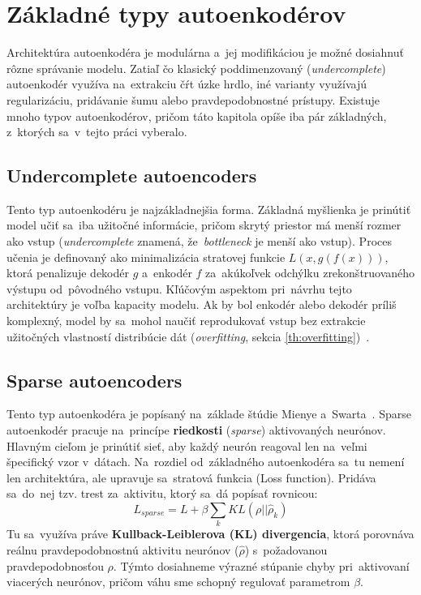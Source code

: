 \section{Základné typy autoenkodérov}\label{th:autoencoder_types}
Architektúra autoenkodéra je modulárna a~jej modifikáciou je možné dosiahnuť rôzne správanie modelu. Zatiaľ čo klasický poddimenzovaný (\textit{undercomplete}) autoenkodér využíva na~extrakciu čŕt úzke hrdlo, iné varianty využívajú regularizáciu, pridávanie šumu alebo pravdepodobnostné prístupy. Existuje mnoho typov autoenkodérov, pričom táto kapitola opíše iba pár základných, z~ktorých sa~v~tejto práci vyberalo.

\subsection{Undercomplete autoencoders}
Tento typ autoenkodéru je najzákladnejšia forma. Základná myšlienka je prinútiť model učiť sa~iba užitočné informácie, pričom skrytý priestor má menší rozmer ako vstup (\textit{undercomplete} znamená, že~\textit{bottleneck} je menší ako vstup). Proces učenia je definovaný ako minimalizácia stratovej funkcie $L(x,g(f(x)))$, ktorá penalizuje dekodér $g$ a~enkodér $f$ za~akúkoľvek odchýlku zrekonštruovaného výstupu od~pôvodného vstupu. Kľúčovým aspektom pri~návrhu tejto architektúry je voľba kapacity modelu. Ak by bol enkodér alebo dekodér príliš komplexný, model by sa~mohol naučiť reprodukovať vstup bez extrakcie užitočných vlastností distribúcie dát (\textit{overfitting}, sekcia \ref{th:overfitting})~\cite{Goodfellow-et-al-2016}.

\subsection{Sparse autoencoders}
Tento typ autoenkodéra je popísaný na~základe štúdie Mienye a~Swarta~\cite{mienye2025deep}. Sparse autoenkodér pracuje na~princípe \textbf{riedkosti} (\textit{sparse}) aktivovaných neurónov. Hlavným cieľom je prinútiť sieť, aby každý neurón reagoval len na~veľmi špecifický vzor v~dátach. Na~rozdiel od~základného autoenkodéra sa~tu nemení len architektúra, ale upravuje sa~stratová funkcia (Loss function). Pridáva sa~do~nej tzv. trest za~aktivitu, ktorý sa~dá popísať rovnicou:
\begin{equation}
    L_{sparse} = L + \beta \sum_k KL(\rho || \hat{\rho}_k)
\end{equation}
Tu sa~využíva práve \textbf{Kullback-Leiblerova (KL) divergencia}, ktorá porovnáva reálnu pravdepodobnostnú aktivitu neurónov ($\hat{\rho}$) s~požadovanou pravdepodobnosťou $\rho$. Týmto dosiahneme výrazné stúpanie chyby pri~aktivovaní viacerých neurónov, pričom váhu sme schopný regulovať parametrom $\beta$.

